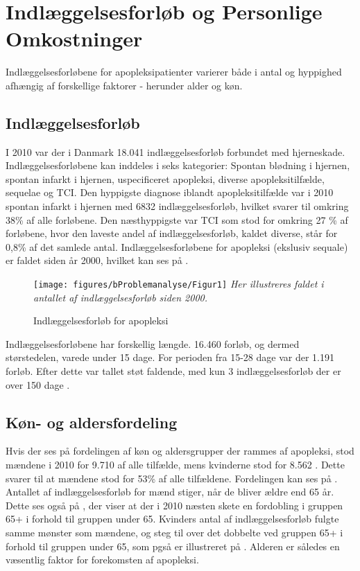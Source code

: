 \section{Indlæggelsesforløb og Personlige Omkostninger}
Indlæggelsesforløbene for apopleksipatienter varierer både i antal og hyppighed afhængig af forskellige faktorer - herunder alder og køn.

\subsection{Indlæggelsesforløb}
I 2010 var der i Danmark 18.041 indlæggelsesforløb forbundet med hjerneskade. Indlæggelsesforløbene kan inddeles i seks kategorier: Spontan blødning i hjernen, spontan infarkt i hjernen, uspecificeret apopleksi, diverse apopleksitilfælde, sequelae og TCI.  Den hyppigste diagnose iblandt apopleksitilfælde var i 2010 spontan infarkt i hjernen med 6832 indlæggelsesforløb, hvilket svarer til omkring 38\% af alle forløbene. Den næsthyppigste var TCI som stod for omkring 27 \% af forløbene, hvor den laveste andel af indlæggelsesforløb, kaldet diverse, står for 0,8\% af det samlede antal.  Indlæggelsesforløbene for apopleksi (ekslusiv sequale) er faldet siden år 2000, hvilket kan ses på .\cite{Sundhedsstyrelsen2011}

\begin{figure}[H]
	\caption{Indlæggelsesforløb for apopleksi}
	\label{Indlaeggelser}
	\centering
	\texttt{[image: figures/bProblemanalyse/Figur1]}
	\flushleft
	\textit{Her illustreres faldet i antallet af indlæggelsesforløb siden 2000.}
\end{figure}

Indlæggelsesforløbene har forskellig længde. 16.460 forløb, og dermed størstedelen, varede under 15 dage. For perioden fra 15-28 dage var der 1.191 forløb. Efter dette var tallet støt faldende, med kun 3 indlæggelsesforløb der er over 150 dage \cite{Sundhedsstyrelsen2011}.

\subsection{Køn- og aldersfordeling}
Hvis der ses på fordelingen af køn og aldersgrupper der rammes af apopleksi, stod mændene i 2010 for 9.710 af alle tilfælde, mens kvinderne stod for 8.562 \cite{Sundhedsstyrelsen2011}. Dette svarer til at mændene stod for 53\% af alle tilfældene. Fordelingen kan ses på .  
Antallet af indlæggelsesforløb for mænd stiger, når de bliver ældre end 65 år. Dette ses også på , der viser at der i 2010 næsten skete en fordobling i gruppen 65+ i forhold til gruppen under 65.
Kvinders antal af indlæggelsesforløb fulgte samme mønster som mændene, og steg til over det dobbelte ved gruppen 65+ i forhold til gruppen under 65, som pgså er illustreret på .\cite{Sundhedsstyrelsen2011} Alderen er således en væsentlig faktor for forekomsten af apopleksi.

